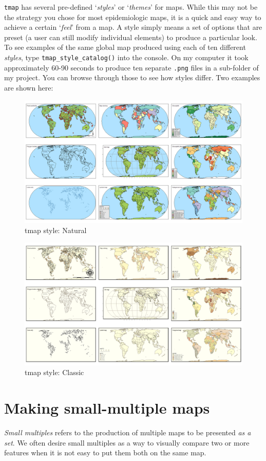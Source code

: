 \documentclass[
]{book}
\begin{document}
\texttt{tmap} has several pre-defined `\emph{styles}' or `\emph{themes}' for maps. While this may not be the strategy you chose for most epidemiologic maps, it is a quick and easy way to achieve a certain `\emph{feel}' from a map. A style simply means a set of options that are preset (a user can still modify individual elements) to produce a particular look. To see examples of the same global map produced using each of ten different \emph{styles}, type \texttt{tmap\_style\_catalog()} into the console. On my computer it took approximately 60-90 seconds to produce ten separate \texttt{.png} files in a sub-folder of my project. You can browse through those to see how styles differ. Two examples are shown here:

\begin{figure}
\includegraphics[width=0.5\linewidth]{images/natural} \caption{tmap style: Natural}\label{fig:unnamed-chunk-20}
\end{figure}

\begin{figure}
\includegraphics[width=0.5\linewidth]{images/classic} \caption{tmap style: Classic}\label{fig:unnamed-chunk-21}
\end{figure}

\hypertarget{making-small-multiple-maps}{%
\section{Making small-multiple maps}\label{making-small-multiple-maps}}

\emph{Small multiples} refers to the production of multiple maps to be presented \emph{as a set}. We often desire small multiples as a way to visually compare two or more features when it is not easy to put them both on the same map.
\end{document}
